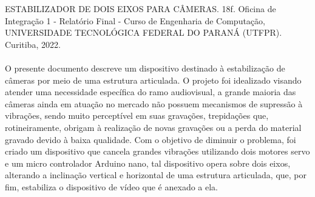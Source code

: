
\begin{resumoutfpr}%
ESTABILIZADOR DE DOIS EIXOS PARA CÂMERAS. 18f. Oficina de Integração 1 - Relatório Final - Curso de Engenharia de Computação, UNIVERSIDADE TECNOLÓGICA FEDERAL DO PARANÁ (UTFPR). Curitiba, 2022.\\\\O presente documento descreve um dispositivo destinado à estabilização de câmeras por meio de uma estrutura articulada. O projeto foi idealizado visando atender uma necessidade específica do ramo audiovisual, a grande maioria das câmeras ainda em atuação no mercado não possuem mecanismos de supressão à vibrações, sendo muito perceptível em suas gravações, trepidações que, rotineiramente, obrigam à realização de novas gravações ou a perda do material gravado devido à baixa qualidade. Com o objetivo de diminuir o problema, foi criado um dispositivo que cancela grandes vibrações utilizando dois motores servo e um micro controlador Arduino nano, tal dispositivo opera sobre dois eixos, alterando a inclinação vertical e horizontal de uma estrutura articulada, que, por fim, estabiliza o dispositivo de vídeo que é anexado a ela.


\end{resumoutfpr}

